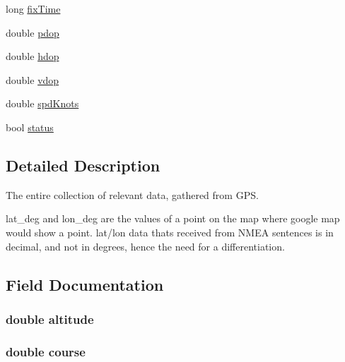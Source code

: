 \begin{DoxyCompactItemize}
long \hyperlink{struct_full_g_p_s_data_a820d96504a74d9f1ab7ae4d962a878ba}{fix\+Time}
\item 
double \hyperlink{struct_full_g_p_s_data_a387b6cbd184865365f92d29fd1ac32c1}{pdop}
\item 
double \hyperlink{struct_full_g_p_s_data_a7ede759392ed439219bdbac4c8ede827}{hdop}
\item 
double \hyperlink{struct_full_g_p_s_data_a4001a0f05d0c57ebdb066d738098bff7}{vdop}
\item 
double \hyperlink{struct_full_g_p_s_data_aafd79f80d0c8c393f4ddad96148f6175}{spd\+Knots}
\item 
bool \hyperlink{struct_full_g_p_s_data_ad1f0bff7112206922c9d5a87adad6f2b}{status}
\end{DoxyCompactItemize}


\subsection{Detailed Description}
The entire collection of relevant data, gathered from G\+PS. 

lat\+\_\+deg and lon\+\_\+deg are the values of a point on the map where google map would show a point. lat/lon data that\textquotesingle{}s received from N\+M\+EA sentences is in decimal, and not in degrees, hence the need for a differentiation. 

\subsection{Field Documentation}
\subsubsection[{\texorpdfstring{altitude}{altitude}}]{\setlength{\rightskip}{0pt plus 5cm}double altitude}\hypertarget{struct_full_g_p_s_data_a2b13d276aee0d9fd646c8fa3647e869b}{}\label{struct_full_g_p_s_data_a2b13d276aee0d9fd646c8fa3647e869b}
\subsubsection[{\texorpdfstring{course}{course}}]{\setlength{\rightskip}{0pt plus 5cm}double course}\hypertarget{struct_full_g_p_s_data_acaa2fde7e3fad7df8f5755347603d17b}{}\label{struct_full_g_p_s_data_acaa2fde7e3fad7df8f5755347603d17b}
